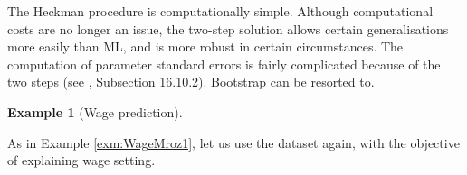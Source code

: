 \documentclass[
  12pt,
]{book}
\newenvironment{Shaded}{\begin{snugshade}}{\end{snugshade}}
\newcommand{\AttributeTok}[1]{\textcolor[rgb]{0.77,0.63,0.00}{#1}}
\newcommand{\CommentTok}[1]{\textcolor[rgb]{0.56,0.35,0.01}{\textit{#1}}}
\newcommand{\ConstantTok}[1]{\textcolor[rgb]{0.00,0.00,0.00}{#1}}
\newcommand{\DecValTok}[1]{\textcolor[rgb]{0.00,0.00,0.81}{#1}}
\newcommand{\FunctionTok}[1]{\textcolor[rgb]{0.00,0.00,0.00}{#1}}
\newcommand{\NormalTok}[1]{#1}
\newcommand{\OtherTok}[1]{\textcolor[rgb]{0.56,0.35,0.01}{#1}}
\newcommand{\SpecialCharTok}[1]{\textcolor[rgb]{0.00,0.00,0.00}{#1}}
\newcommand{\StringTok}[1]{\textcolor[rgb]{0.31,0.60,0.02}{#1}}
\theoremstyle{definition}
\theoremstyle{definition}
\newtheorem{example}{Example}[chapter]
\theoremstyle{definition}
\theoremstyle{definition}
\theoremstyle{remark}
\begin{document}
The Heckman procedure is computationally simple. Although computational costs are no longer an issue, the two-step solution allows certain generalisations more easily than ML, and is more robust in certain circumstances. The computation of parameter standard errors is fairly complicated because of the two steps (see \citet{Cameron_Trivedi_2005}, Subsection 16.10.2). Bootstrap can be resorted to.

\begin{example}[Wage prediction]
\protect\hypertarget{exm:WageSample}{}\label{exm:WageSample}

As in Example \ref{exm:WageMroz1}, let us use the \citet{Mroz_1987} dataset again, with the objective of explaining wage setting.

\begin{Shaded}
\end{Shaded}
\end{example}
\end{document}
